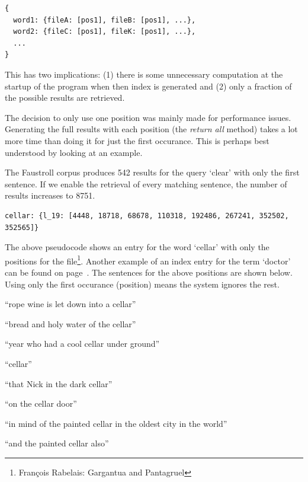 \begin{verbatim}
{
  word1: {fileA: [pos1], fileB: [pos1], ...},
  word2: {fileC: [pos1], fileK: [pos1], ...},
  ...
}
\end{verbatim}

This has two implications: (1) there is some unnecessary computation at the startup of the program when then index is generated and (2) only a fraction of the possible results are retrieved.

The decision to only use one position was mainly made for performance issues. Generating the full results with each position (the \emph{return all} method) takes a lot more time than doing it for just the first occurance. This is perhaps best understood by looking at an example.

The Faustroll corpus produces \num{542} results for the query `clear' with only the first sentence. If we enable the retrieval of every matching sentence, the number of results increases to \num{8751}.

\begin{verbatim}
cellar: {l_19: [4448, 18718, 68678, 110318, 192486, 267241, 352502, 352565]}
\end{verbatim}

The above pseudocode shows an entry for the word `cellar' with only the positions for the  file\footnote{Fran\c{c}ois Rabelais: Gargantua and Pantagruel}. Another example of an index entry for the term `doctor' can be found on page~\pageref{c:pos}. The sentences for the above positions are shown below. Using only the first occurance (position) means the system ignores the rest.

\begin{description}[leftmargin=2.2cm]
  \item[4448] ``rope wine is let down into a cellar''
  \item[18718] ``bread and holy water of the cellar''
  \item[68678] ``year who had a cool cellar under ground''
  \item[110318] ``cellar''
  \item[192486] ``that Nick in the dark cellar''
  \item[267241] ``on the cellar door''
  \item[352502] ``in mind of the painted cellar in the oldest city in the world''
  \item[352565] ``and the painted cellar also''
\end{description}

